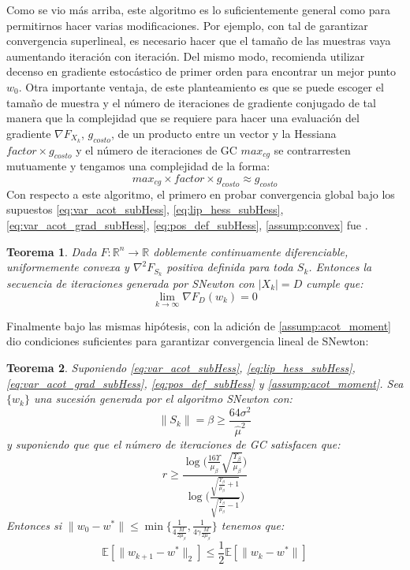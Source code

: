 \documentclass{book}
\theoremstyle{plain}
\newtheorem{thm}{Teorema}[section]
\theoremstyle{definition}
\theoremstyle{remark}
\begin{document}
Como se vio más arriba, este algoritmo es lo suficientemente general como para permitirnos hacer varias modificaciones. Por ejemplo, con tal de garantizar convergencia superlineal, es necesario hacer que el tamaño de las muestras vaya aumentando iteración con iteración. Del mismo modo, \cite{BOTTOU} recomienda utilizar decenso en gradiente estocástico de primer orden para encontrar un mejor punto $w_0$. Otra importante ventaja, de este planteamiento es que se puede escoger el tamaño de muestra y el número de iteraciones de gradiente conjugado de tal manera que la complejidad que se requiere para hacer una evaluación del gradiente $\nabla F_{X_k}$, $g_{costo}$, de un producto entre un vector y la Hessiana $factor\times g_{costo}$ y el número de iteraciones de GC $max_{cg}$ se contrarresten mutuamente y tengamos una complejidad de la forma:
\begin{equation*}
    max_{cg}\times factor \times g_{costo} \approx g_{costo}
\end{equation*}
Con respecto a este algoritmo, el primero en probar convergencia global bajo los supuestos \ref{eq:var_acot_subHess}, \ref{eq:lip_hess_subHess}, \ref{eq:var_acot_grad_subHess}, \ref{eq:pos_def_subHess}, \ref{assump:convex} fue \cite{BYRD}.
\begin{thm}\label{thm:globalConvNewton}
Dada $F:\mathbb{R}^n\rightarrow\mathbb{R}$ doblemente continuamente diferenciable, uniformemente convexa y $\nabla^2F_{S_k}$ positiva definida para toda $S_k$. Entonces la secuencia de iteraciones generada por SNewton con $|X_k|=D$ cumple que:
\begin{equation}
    \displaystyle\lim_{k\rightarrow\infty}\nabla F_{D}(w_k) = 0
\end{equation}
\end{thm}
Finalmente bajo las mismas hipótesis, con la adición de \ref{assump:acot_moment}  \cite{BOLLAPRAGADA} dio condiciones suficientes para garantizar convergencia lineal de SNewton:
\begin{thm}
Suponiendo \ref{eq:var_acot_subHess}, \ref{eq:lip_hess_subHess}, \ref{eq:var_acot_grad_subHess}, \ref{eq:pos_def_subHess} y \ref{assump:acot_moment}. Sea $\{w_k\}$ una sucesión generada por el algoritmo SNewton con:
\begin{equation}
    \|S_k\| = \beta \geq \frac{64\sigma^2}{\hat{\mu}^2}
\end{equation}
y suponiendo que que el número de iteraciones de GC satisfacen que:
\begin{equation*}
    r \geq \frac{\log\bigg(\frac{16\Upsilon}{\mu_\beta}\sqrt{\frac{\Upsilon_\beta}{\mu_\beta}}\bigg)}{\log\Bigg(\frac{\sqrt{\frac{\Upsilon_\beta}{\mu_\beta} + 1}}{\sqrt{\frac{\Upsilon_\beta}{\mu_\beta} - 1}}\Bigg)}
\end{equation*}
Entonces si $\|w_0 - w^*\|\leq\displaystyle\min\Bigg\{\frac{1}{4\frac{M}{2\mu_\beta}},\frac{1}{4\gamma\frac{M}{2\mu_\beta}}\Bigg\}$ tenemos que:
\begin{equation}
    \mathbb{E}[\|w_{k+1} - w^*\|_2] \leq \frac{1}{2}\mathbb{E}[\|w_{k} - w^*\|]
\end{equation}

\end{thm}
\end{document}
